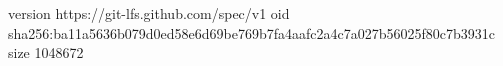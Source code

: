 version https://git-lfs.github.com/spec/v1
oid sha256:ba11a5636b079d0ed58e6d69be769b7fa4aafc2a4c7a027b56025f80c7b3931c
size 1048672

